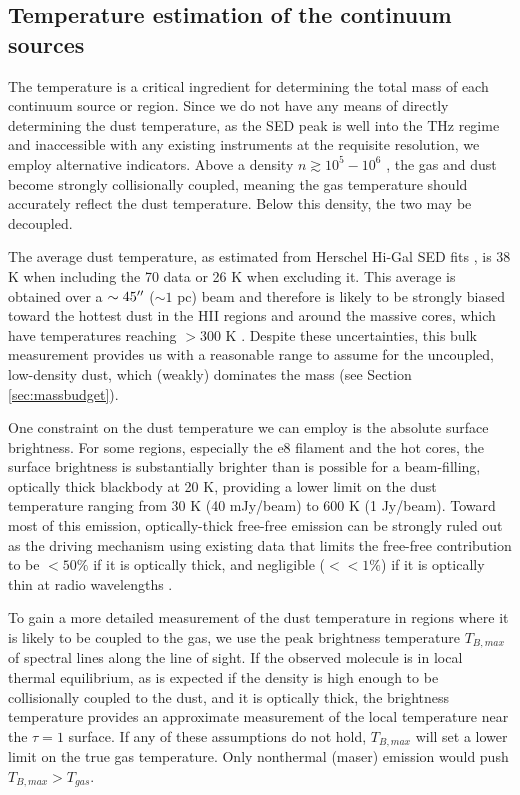 \documentclass{aa}
\begin{document}
\subsection{Temperature estimation of the continuum sources}
\label{sec:temperature}
The temperature is a critical ingredient for determining the total mass of each
continuum source or region. Since we do not have any means of directly
determining the dust temperature, as the SED peak is well into the THz regime
and inaccessible with any existing instruments at the requisite resolution, we
employ alternative indicators.  Above a density $n\gtrsim10^5-10^6$ \percc,
the gas and dust become strongly collisionally coupled, meaning the gas
temperature should accurately reflect the dust temperature.  Below this density,
the two may be decoupled.

The average dust temperature, as estimated from Herschel Hi-Gal SED fits
\citep{Molinari2016a,Wang2015a}, is 38 K when including the 70 \um data or 26 K
when excluding it.  This average is obtained over a $\sim45\mbox{$^{\prime\prime}$}$ ($\sim 1$
pc) beam and therefore is likely to be strongly biased toward the hottest dust
in the HII regions and around the massive cores, which have
temperatures reaching $>300$ K \citep{Goddi2016a}.  Despite these
uncertainties, this bulk measurement provides us with a reasonable range to
assume for the uncoupled, low-density dust, which (weakly) dominates the mass
(see Section \ref{sec:massbudget}).

One constraint on the dust temperature we can employ is the absolute surface
brightness.  For some regions, especially the e8 filament and the hot cores,
the surface brightness is substantially
brighter than is possible for a beam-filling, optically thick blackbody at 20
K, providing a lower limit on the dust temperature ranging from 30 K (40
mJy/beam) to 600 K (1 Jy/beam).  Toward most of this emission, optically-thick
free-free emission can be strongly ruled out as the driving mechanism using
existing data that limits the free-free contribution to be $<50\%$ if it is
optically thick, and negligible ($<<1\%$) if it is optically thin at radio wavelengths
\citep{Ginsburg2016b, Goddi2016a}.

To gain a more detailed measurement of the dust temperature in regions where it
is likely to be coupled to the gas, we use the peak brightness temperature
$T_{B,max}$ of spectral lines along the line of sight.  If the observed
molecule is in local thermal equilibrium, as is expected if the density is high
enough to be collisionally coupled to the dust, and it is optically thick, the
brightness temperature provides an approximate measurement of the local
temperature near the $\tau=1$ surface.  If any of these assumptions do not
hold, $T_{B,max}$ will set a lower limit on the true gas temperature.  Only
nonthermal (maser) emission would push $T_{B,max} > T_{gas}$.
\end{document}
